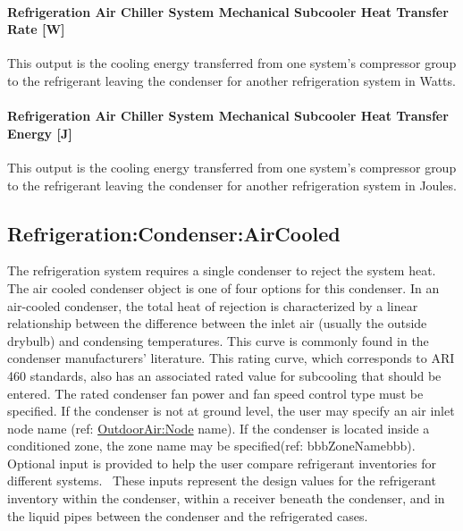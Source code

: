 \paragraph{Refrigeration Air Chiller System Mechanical Subcooler Heat Transfer Rate {[}W{]}}\label{refrigeration-air-chiller-system-mechanical-subcooler-heat-transfer-rate-w}

This output is the cooling energy transferred from one system's compressor group to the refrigerant leaving the condenser for another refrigeration system in Watts.

\paragraph{Refrigeration Air Chiller System Mechanical Subcooler Heat Transfer Energy {[}J{]}}\label{refrigeration-air-chiller-system-mechanical-subcooler-heat-transfer-energy-j-1}

This output is the cooling energy transferred from one system's compressor group to the refrigerant leaving the condenser for another refrigeration system in Joules.

\subsection{Refrigeration:Condenser:AirCooled}\label{refrigerationcondenseraircooled}

The refrigeration system requires a single condenser to reject the system heat.~ The air cooled condenser object is one of four options for this condenser. In an air-cooled condenser, the total heat of rejection is characterized by a linear relationship between the difference between the inlet air (usually the outside drybulb) and condensing temperatures. This curve is commonly found in the condenser manufacturers' literature. This rating curve, which corresponds to ARI 460 standards, also has an associated rated value for subcooling that should be entered. The rated condenser fan power and fan speed control type must be specified. If the condenser is not at ground level, the user may specify an air inlet node name (ref: \hyperref[outdoorairnode]{OutdoorAir:Node} name). If the condenser is located inside a conditioned zone, the zone name may be specified(ref: bbbZoneNamebbb). Optional input is provided to help the user compare refrigerant inventories for different systems.~ These inputs represent the design values for the refrigerant inventory within the condenser, within a receiver beneath the condenser, and in the liquid pipes between the condenser and the refrigerated cases.

